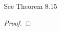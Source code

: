 \documentclass[../../main.tex]{subfiles}
\begin{document}
\begin{wts}
    See Theorem 8.15
\end{wts}
\begin{proof}

\end{proof}
\end{document}
